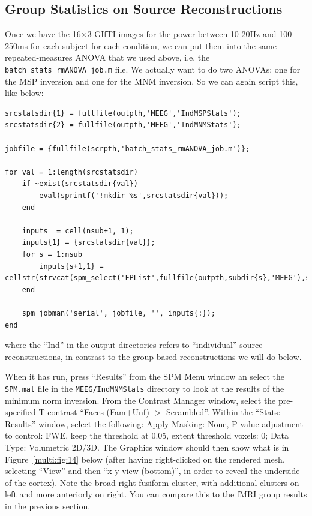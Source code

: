 \subsection{Group Statistics on Source Reconstructions}

Once we have the 16\(\times\)3 GIfTI images for the power between 10-20Hz and 100-250ms for each subject for each condition, we can put them into the same repeated-measures ANOVA that we used above, i.e. the \texttt{batch\_stats\_rmANOVA\_job.m} file. We actually want to do two ANOVAs: one for the MSP inversion and one for the MNM inversion. So we can again script this, like below:

\begin{lstlisting}[style=Matlab-editor,basicstyle=\mlttfamily\footnotesize]
srcstatsdir{1} = fullfile(outpth,'MEEG','IndMSPStats');
srcstatsdir{2} = fullfile(outpth,'MEEG','IndMNMStats');

jobfile = {fullfile(scrpth,'batch_stats_rmANOVA_job.m')};

for val = 1:length(srcstatsdir)
    if ~exist(srcstatsdir{val})
        eval(sprintf('!mkdir %s',srcstatsdir{val}));
    end
    
    inputs  = cell(nsub+1, 1);    
    inputs{1} = {srcstatsdir{val}};    
    for s = 1:nsub
        inputs{s+1,1} = cellstr(strvcat(spm_select('FPList',fullfile(outpth,subdir{s},'MEEG'),sprintf('^apMcbdspmeeg_run_01_sss_%d.*\.gii$',val))));   
    end
    
    spm_jobman('serial', jobfile, '', inputs{:});
end
\end{lstlisting}

where the ``Ind'' in the output directories refers to ``individual'' source reconstructions, in contrast to the group-based reconstructions we will do below. 

When it has run, press ``Results'' from the SPM Menu window an select the \texttt{SPM.mat} file in the \texttt{MEEG/IndMNMStats} directory to look at the results of the minimum norm inversion. From the Contrast Manager window, select the pre-specified T-contrast ``Faces (Fam+Unf) \(>\) Scrambled''.  Within the ``Stats: Results'' window, select the following:  Apply Masking: None, P value adjustment to control: FWE, keep the threshold at 0.05, extent threshold {voxels}: 0; Data Type: Volumetric 2D/3D. The Graphics window should then show what is in Figure~\ref{multi:fig:14} below (after having right-clicked on the rendered mesh, selecting ``View'' and then  ``x-y view (bottom)'', in order to reveal the underside of the cortex). Note the broad right fusiform cluster, with additional clusters on left and more anteriorly on right. You can compare this to the fMRI group results in the previous section.

